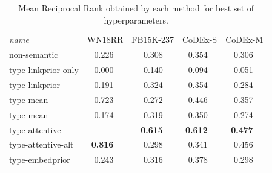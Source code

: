 \begin{table}[p]
    \def\fn{\hspace{2pt}} %
    \setlength{\tabcolsep}{5pt}
    \centering
    \begin{tabular}{lr@{\fn}lr@{\fn}lr@{\fn}lr@{\fn}l}
        \toprule
        \textit{name}
        &\multicolumn{2}{l}{WN18RR}
                    &\multicolumn{2}{l}{FB15K-237}   
                           & \multicolumn{2}{l}{CoDEx-S}   
                                        & \multicolumn{2}{l}{CoDEx-M} \\
        \cmidrule{1-9}
        non-semantic        & 0.226 && 0.308    && 0.354    && 0.306   \\
        \cmidrule{1-9}
        type-linkprior-only & 0.000 && 0.140    && 0.094    && 0.051   \\
        type-linkprior      & 0.191 && 0.324    && 0.354    && 0.284   \\
        \cmidrule{1-9}
        type-mean           & 0.723 && 0.272    && 0.446    && 0.357   \\
        type-mean+          & 0.174 && 0.319    && 0.350    && 0.274   \\
        type-attentive      & -     &&\textbf{0.615}&%
                                                 &\textbf{0.612}
                                                            &&\textbf{0.477}   \\
        type-attentive-alt  &\textbf{0.816}
                                    && 0.298    && 0.341    && 0.456   \\
        \cmidrule{1-9}
        type-embedprior     & 0.243 && 0.316    && 0.378    && 0.298   \\
        \bottomrule
    \end{tabular} \vspace{1em}
    \caption[MRR obtained by each method for best set of hyperparameters.]{Mean Reciprocal Rank obtained by each method for best set of hyperparameters. } \label{tab:hyperparam-search-results1}
\end{table}


